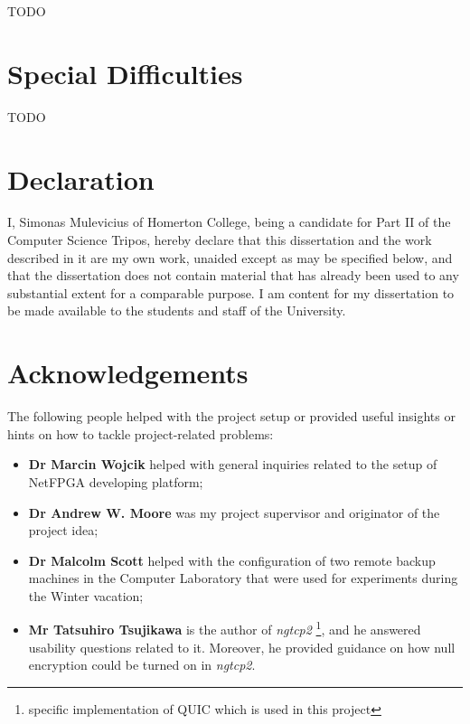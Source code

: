 \documentclass[12pt,a4paper,twoside,openright]{report}
\begin{document}
TODO

\section*{Special Difficulties}

TODO
 
\newpage
\section*{Declaration}

I, Simonas Mulevicius of Homerton College, being a candidate for Part II of the Computer
Science Tripos, hereby declare
that this dissertation and the work described in it are my own work,
unaided except as may be specified below, and that the dissertation
does not contain material that has already been used to any substantial
extent for a comparable purpose. I am content for my dissertation to
be made available to the students and staff of the University.

\bigskip
{}

\medskip
{}






\tableofcontents

\listoffigures

\newpage
\section*{Acknowledgements}

The following people helped with the project setup or provided useful insights or hints on how to tackle project-related problems:
\begin{itemize}
    \item \textbf{Dr Marcin Wojcik} helped with general inquiries related to the setup of NetFPGA developing platform;
    \item \textbf{Dr Andrew W. Moore} was my project supervisor and originator of the project idea;
    \item \textbf{Dr Malcolm Scott} helped with the configuration of two remote backup machines in the Computer Laboratory that were used for experiments during the Winter vacation;
    \item \textbf{Mr Tatsuhiro Tsujikawa} is the author of \textit{ngtcp2} \footnote{specific implementation of QUIC which is used in this project}, and he answered usability questions related to it. Moreover, he provided guidance on how null encryption could be turned on in \textit{ngtcp2}.
    
\end{itemize}
\end{document}
